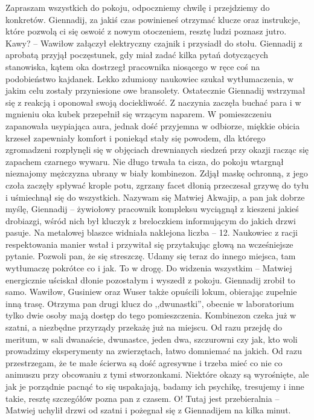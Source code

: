 \documentclass[../MAIN.tex]{subfiles}
\begin{document}
% 
\sx Zapraszam wszystkich do pokoju, odpoczniemy chwilę i przejdziemy do konkretów. Giennadij, za jakiś czas powinieneś otrzymać klucze oraz instrukcje, które pozwolą ci się oswoić z nowym otoczeniem, resztę ludzi poznasz jutro. Kawy? -- Wawiłow załączył elektryczny czajnik i przysiadł do stołu. 
\qd
Giennadij z aprobatą przyjął poczęstunek, gdy miał zadać kilka pytań dotyczących stanowiska, kątem oka dostrzegł pracownika niosącego w ręce coś na podobieństwo kajdanek. Lekko zdumiony naukowiec szukał wytłumaczenia, w jakim celu zostały przyniesione owe bransolety. Ostatecznie Giennadij wstrzymał się z reakcją i oponował swoją dociekliwość. Z naczynia zaczęła buchać para i w mgnieniu oka kubek przepełnił się wrzącym naparem. W pomieszczeniu zapanowała usypiająca aura, jednak dość przyjemna w odbiorze, miękkie obicia krzeseł zapewniały komfort i poniekąd stały się powodem, dla którego zgromadzeni rozpłynęli się w objęciach drewnianych siedzeń przy okazji racząc się zapachem czarnego wywaru. Nie długo trwała ta cisza, do pokoju wtargnął nieznajomy mężczyzna ubrany w biały kombinezon. Zdjął maskę ochronną, z jego czoła zaczęły spływać krople potu, zgrzany facet dłonią przeczesał grzywę do tyłu i uśmiechnął się do wszystkich.
% 
\sx Nazywam się Matwiej Akwajip, a pan jak dobrze myślę, Giennadij -- żywiołowy pracownik kompleksu wyciągnął z kieszeni jakieś drobiazgi, wśród nich był kluczyk z breloczkiem informującym do jakich drzwi pasuje. Na metalowej blaszce widniała naklejona liczba -- 12. Naukowiec z racji respektowania manier wstał i przywitał się przytakując głową na wcześniejsze pytanie. 
\xx Pozwoli pan, że się streszczę. Udamy się teraz do innego miejsca, tam wytłumaczę pokrótce co i jak. To w drogę. Do widzenia wszystkim -- Matwiej energicznie uściskał dłonie pozostałym i wyszedł z pokoju. 
\qd
Giennadij zrobił to samo. Wawiłow, Gusiniew oraz Wuser także opuścili lokum, obierając zupełnie inną trasę. 
\sx Otrzyma pan drugi klucz do ,,dwunastki'', obecnie w laboratorium tylko dwie osoby mają dostęp do tego pomieszczenia. Kombinezon czeka już w szatni, a niezbędne przyrządy przekażę już na miejscu. Od razu przejdę do meritum, w sali dwanaście, dwunastce, jeden dwa, szczurowni czy jak, kto woli prowadzimy eksperymenty na zwierzętach, łatwo domniemać na jakich. Od razu przestrzegam, że te małe ścierwa są dość agresywne i trzeba mieć co nie co animuszu przy obcowaniu z tymi stworzonkami. Niektóre okazy są wyrośnięte, ale jak je porządnie pacnąć to się uspakajają, badamy ich psychikę, tresujemy i inne takie, resztę szczegółów pozna pan z czasem. O! Tutaj jest przebieralnia -- Matwiej uchylił drzwi od szatni i pożegnał się z Giennadijem na kilka minut. 
\end{document}
